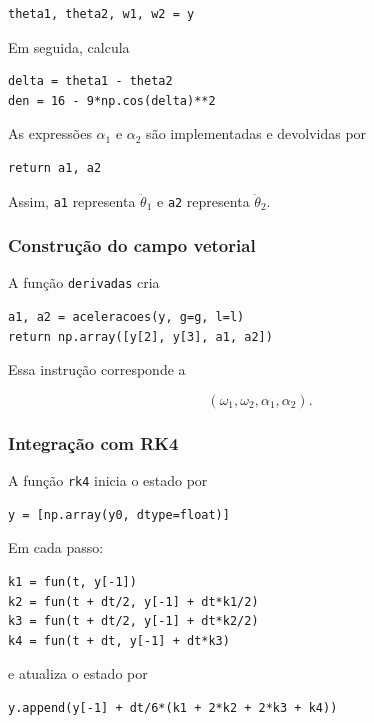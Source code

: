 \documentclass[12pt,a4paper]{article}
\begin{document}
\begin{lstlisting}
theta1, theta2, w1, w2 = y
\end{lstlisting}

Em seguida, calcula

\begin{lstlisting}
delta = theta1 - theta2
den = 16 - 9*np.cos(delta)**2
\end{lstlisting}

As expressões $\alpha_1$ e $\alpha_2$ são implementadas e devolvidas por

\begin{lstlisting}
return a1, a2
\end{lstlisting}

Assim, \texttt{a1} representa $\ddot{\theta}_1$ e \texttt{a2} representa $\ddot{\theta}_2$.

\subsubsection{Construção do campo vetorial}

A função \texttt{derivadas} cria

\begin{lstlisting}
a1, a2 = aceleracoes(y, g=g, l=l)
return np.array([y[2], y[3], a1, a2])
\end{lstlisting}

Essa instrução corresponde a

\begin{equation}
(\omega_1,\omega_2,\alpha_1,\alpha_2).
\end{equation}

\subsubsection{Integração com RK4}

A função \texttt{rk4} inicia o estado por

\begin{lstlisting}
y = [np.array(y0, dtype=float)]
\end{lstlisting}

Em cada passo:

\begin{lstlisting}
k1 = fun(t, y[-1])
k2 = fun(t + dt/2, y[-1] + dt*k1/2)
k3 = fun(t + dt/2, y[-1] + dt*k2/2)
k4 = fun(t + dt, y[-1] + dt*k3)
\end{lstlisting}

e atualiza o estado por

\begin{lstlisting}
y.append(y[-1] + dt/6*(k1 + 2*k2 + 2*k3 + k4))
\end{lstlisting}
\end{document}

